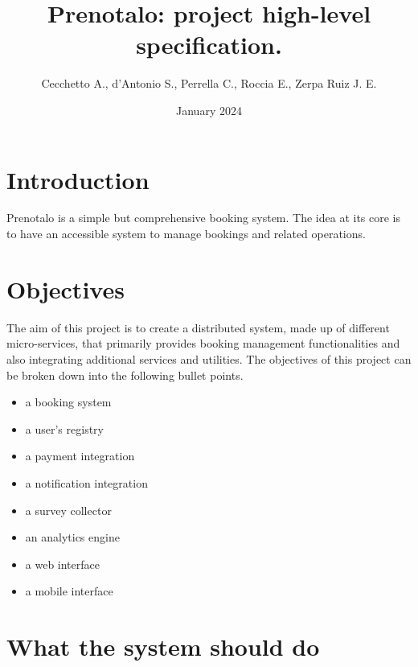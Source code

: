 \documentclass{article}
\title{Prenotalo: project high-level specification.}
\author{Cecchetto A., d'Antonio S., Perrella C., Roccia E., Zerpa Ruiz J. E.}
\date{January 2024}
\begin{document}
\maketitle


\section{Introduction}
Prenotalo is a simple but comprehensive booking system. The idea at its core is
to have an accessible system to manage bookings and related operations.

\section{Objectives}
The aim of this project is to create a distributed system, made up of different
micro-services, that primarily provides booking management functionalities
and also integrating additional services and utilities. The objectives of this project can be broken down into the following bullet points.
\begin{itemize}
\item a booking system
\item a user's registry
\item a payment integration
\item a notification integration
\item a survey collector
\item an analytics engine
\item a web interface
\item a mobile interface
\end{itemize}

\section{What the system should do}
\end{document}
